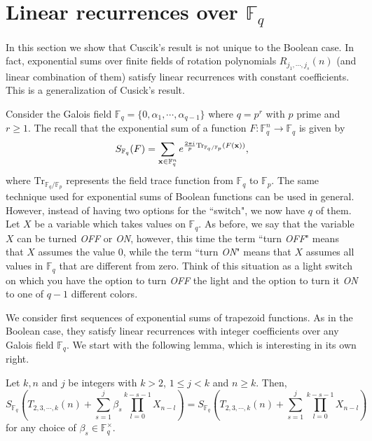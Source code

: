 
\section{Linear recurrences over $\mathbb{F}_q$}
\label{anyGalois}

In this section we show that Cuscik's result is not unique to the Boolean case.  In fact, exponential sums over finite fields of rotation polynomials $R_{j_1,\cdots,j_s}(n)$ (and linear combination
of them) satisfy linear recurrences with constant coefficients.  This is a generalization of Cusick's result.

Consider the Galois field $\mathbb{F}_q = \{0,\alpha_1,\cdots,\alpha_{q-1}\}$ where $q=p^r$ with $p$ prime and $r\geq 1$.  The recall that the exponential sum
of a function $F:\mathbb{F}_q^n \to \mathbb{F}_q$ is given by
\begin{equation}
 S_{\mathbb{F}_q}(F)=\sum_{{\bf x}\in \mathbb{F}^n_q} e^{\frac{2\pi i}{p} \text{Tr}_{\mathbb{F}_q/\mathbb{F}_p}(F({\bf x}))},
\end{equation}
where $\text{Tr}_{\mathbb{F}_q/\mathbb{F}_p}$ represents the field trace function from $\mathbb{F}_q$ to $\mathbb{F}_p$.
The same technique used for exponential sums of Boolean functions can be used in general.  However, instead of having two options for the ``switch", we now have $q$ of them.  Let $X$ be a variable which takes values on $\mathbb{F}_q$.  As before, we say that the variable $X$ can be turned {\it OFF} or {\it ON}, however, this time the term ``turn {\it OFF}" means that $X$ assumes the value 0, while the term ``turn {\it ON}" means that $X$ assumes all values in $\mathbb{F}_q$ that are different from zero.  Think of this situation as a light switch on which you have the option to turn  {\it OFF} the light and the option to turn it {\it ON} to one of $q-1$ different colors.


We consider first sequences of exponential sums of trapezoid functions.  As in the Boolean case, they satisfy linear recurrences with integer coefficients over any Galois field 
$\mathbb{F}_q$.   We start with the following lemma, which is interesting in its own right.

\begin{lemma}
\label{generallemma}
Let $k, n$ and $j$ be integers with $k>2$, $1\leq j<k$ and $n\geq k$.   Then,
\begin{equation}
S_{\mathbb{F}_q}\left(T_{2,3,\cdots,k}(n)+\sum_{s=1}^j\beta_s\prod_{l=0}^{k-s-1}X_{n-l}\right)=S_{\mathbb{F}_q}\left(T_{2,3,\cdots,k}(n)+\sum_{s=1}^j\prod_{l=0}^{k-s-1}X_{n-l}\right)
\end{equation}
for any choice of $\beta_{s} \in \mathbb{F}_q^\times$.
\end{lemma}

